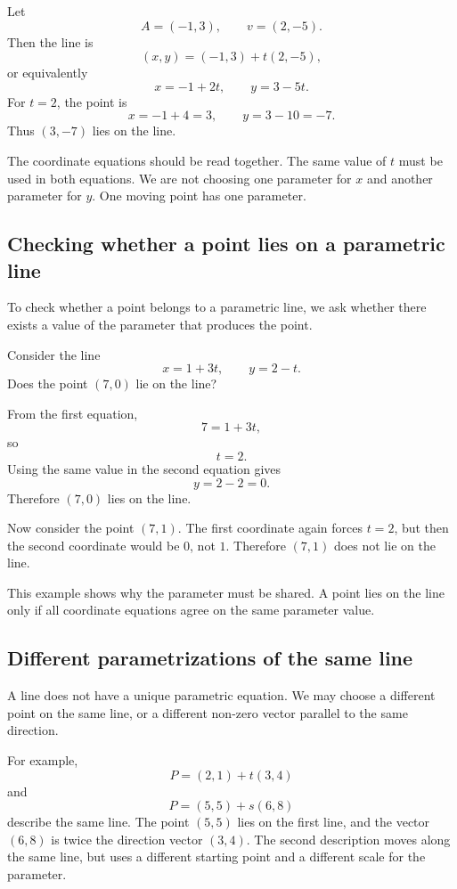\begin{examplebox}
Let
\[
A=(-1,3),
\qquad
v=(2,-5).
\]
Then the line is
\[
(x,y)=(-1,3)+t(2,-5),
\]
or equivalently
\[
x=-1+2t,
\qquad
y=3-5t.
\]
For \(t=2\), the point is
\[
x=-1+4=3,
\qquad
y=3-10=-7.
\]
Thus \((3,-7)\) lies on the line.
\end{examplebox}

The coordinate equations should be read together. The same value of \(t\) must be used in both equations. We are not choosing one parameter for \(x\) and another parameter for \(y\). One moving point has one parameter.

\subsection*{Checking whether a point lies on a parametric line}

To check whether a point belongs to a parametric line, we ask whether there exists a value of the parameter that produces the point.

\begin{examplebox}
Consider the line
\[
x=1+3t,
\qquad
y=2-t.
\]
Does the point \((7,0)\) lie on the line?

From the first equation,
\[
7=1+3t,
\]
so
\[
t=2.
\]
Using the same value in the second equation gives
\[
y=2-2=0.
\]
Therefore \((7,0)\) lies on the line.

Now consider the point \((7,1)\). The first coordinate again forces \(t=2\), but then the second coordinate would be \(0\), not \(1\). Therefore \((7,1)\) does not lie on the line.
\end{examplebox}

This example shows why the parameter must be shared. A point lies on the line only if all coordinate equations agree on the same parameter value.

\subsection*{Different parametrizations of the same line}

A line does not have a unique parametric equation. We may choose a different point on the same line, or a different non-zero vector parallel to the same direction.

For example,
\[
P=(2,1)+t(3,4)
\]
and
\[
P=(5,5)+s(6,8)
\]
describe the same line. The point \((5,5)\) lies on the first line, and the vector \((6,8)\) is twice the direction vector \((3,4)\). The second description moves along the same line, but uses a different starting point and a different scale for the parameter.

